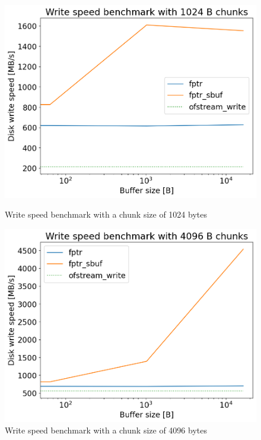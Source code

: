   \begin{figure}[H]
    \centering
    \begin{minipage}{.45\textwidth}
      \centering
      \includegraphics[width=\linewidth]{media/write_bench_1024.png}
      \caption{Write speed benchmark with a chunk size of 1024 bytes}
      \label{fig:write_bench_1024}
    \end{minipage}%
    \hfill
    \begin{minipage}{.45\textwidth}
      \centering
      \includegraphics[width=\linewidth]{media/write_bench_4096.png}
      \caption{Write speed benchmark with a chunk size of 4096 bytes}
      \label{fig:write_bench_4096}
    \end{minipage}
  \end{figure}


